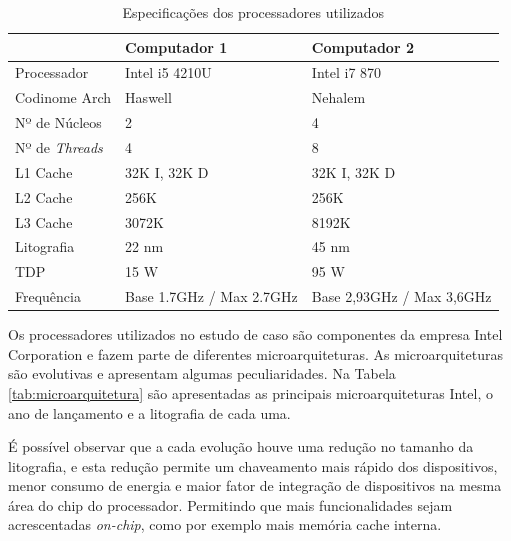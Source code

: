 \documentclass[conference]{IEEEtran}
\begin{document}
        
        \begin{table}[ht]
            \caption{Especificações dos processadores utilizados \cite{inteli5} \cite{inteli7}}
            \begin{center}
                \begin{tabular}{l|l|l}
                    \hline
                    & Computador 1  & Computador 2 \\
                    \hline
                    Processador & Intel i5 4210U  & Intel i7 870 \\
                    \hline
                    Codinome Arch & Haswell  & Nehalem \\
                    \hline
                    Nº de Núcleos & 2 & 4\\
                    \hline
                    Nº de \textit{Threads} & 4 & 8\\
                    \hline
                    L1 Cache & 32K I, 32K D & 32K I, 32K D\\
                    \hline
                    L2 Cache & 256K & 256K\\
                    \hline
                    L3 Cache & 3072K & 8192K\\
                    \hline
                    Litografia & 22 nm & 45 nm\\
                    \hline
                    TDP & 15 W & 95 W\\
                    \hline
                    Frequência & Base 1.7GHz / Max 2.7GHz & Base 2,93GHz / Max 3,6GHz\\
                    \hline
                \end{tabular}
            \end{center}
            \label{tab:processadores}
        \end{table}        
    
    
    
        Os processadores utilizados no estudo de caso são componentes da empresa Intel Corporation e fazem parte de diferentes microarquiteturas. As microarquiteturas são evolutivas e apresentam algumas peculiaridades. Na Tabela \ref{tab:microarquitetura} são apresentadas as principais microarquiteturas Intel, o ano de lançamento e a litografia de cada uma.
        
        É possível observar que a cada evolução houve uma redução no tamanho da litografia, e esta redução permite um chaveamento mais rápido dos dispositivos, menor consumo de energia e maior fator de integração de dispositivos na mesma área do chip do processador. Permitindo que mais funcionalidades sejam acrescentadas \textit{on-chip}, como por exemplo mais memória cache interna.
        
\end{document}
